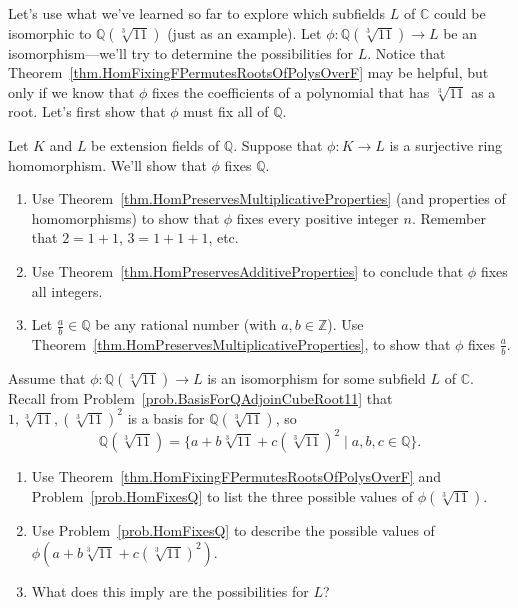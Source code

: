 Let's use what we've learned so far to explore which subfields $L$ of $\mathbb{C}$ could be isomorphic to $\mathbb{Q}(\sqrt[3]{11})$ (just as an example). Let $\phi:\mathbb{Q}(\sqrt[3]{11})\to L$ be an isomorphism---we'll try to determine the possibilities for $L$. Notice that Theorem~\ref{thm.HomFixingFPermutesRootsOfPolysOverF} may be helpful, but only if we know that $\phi$ fixes the coefficients of a polynomial that has $\sqrt[3]{11}$ as a root. Let's first show that $\phi$ must fix all of $\mathbb{Q}$. 

\begin{problem}\label{prob.HomFixesQ}
Let $K$ and $L$ be extension fields of $\mathbb{Q}$. Suppose that $\phi:K\to L$ is a surjective ring homomorphism. We'll show that $\phi$ fixes $\mathbb{Q}$.
\begin{enumerate}
\item Use Theorem~\ref{thm.HomPreservesMultiplicativeProperties} (and properties of homomorphisms) to show that $\phi$ fixes every positive integer $n$. Remember that $2=1+1$, $3 = 1+1+1$, etc.
\item Use Theorem~\ref{thm.HomPreservesAdditiveProperties} to conclude that $\phi$ fixes all integers.
\item Let $\frac{a}{b}\in \mathbb{Q}$ be any rational number (with $a,b\in \mathbb{Z}$). Use Theorem~\ref{thm.HomPreservesMultiplicativeProperties}, to show that $\phi$ fixes  $\frac{a}{b}$.
\end{enumerate}
\end{problem}

\begin{problem}\label{prob.SubfieldsIsoToQAdjoinCubeRoot11}
Assume that $\phi:\mathbb{Q}(\sqrt[3]{11})\to L$ is an isomorphism for some subfield $L$ of $\mathbb{C}$.
Recall from Problem~\ref{prob.BasisForQAdjoinCubeRoot11} that $1,\sqrt[3]{11},(\sqrt[3]{11})^2$ is a basis for $\mathbb{Q}(\sqrt[3]{11})$, so 
\[ \mathbb{Q}(\sqrt[3]{11})= \{a+b\sqrt[3]{11} + c (\sqrt[3]{11})^2\mid a,b,c\in \mathbb{Q}\}.\] 
\begin{enumerate}
\item Use Theorem~\ref{thm.HomFixingFPermutesRootsOfPolysOverF} and Problem~\ref{prob.HomFixesQ} to list the three possible values of $\phi(\sqrt[3]{11})$.
\item Use Problem~\ref{prob.HomFixesQ} to describe the possible values of $\phi(a+b\sqrt[3]{11} + c (\sqrt[3]{11})^2)$.
\item What does this imply are the possibilities for $L$?
\end{enumerate}
\end{problem}

